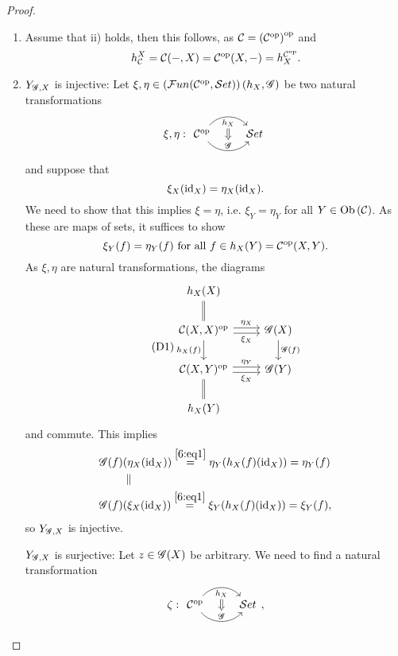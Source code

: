 \begin{proof}
  \begin{enumerate}
    \item Assume that ii) holds, then this follows, as $\mathcal{C} = \left(\mathcal{C}^{\mathrm{op}}\right)^{\mathrm{op}}$ and
    \[
    h^X_{\mathcal{C}} = \mathcal{C}(-,X) = \mathcal{C}^{\mathrm{op}}(X,-)=h_X^{\mathcal{C}^{\mathrm{op}}}.
    \]
    \item $Y_{\mathscr{G},X}$ is injective: Let $\xi,\eta\in \left(\mathcal{F}un(\mathcal{C}^{\mathrm{op}},\mathcal{S}et)\right)(h_X,\mathscr{G})$ be two natural transformations
    \[
    \xi,\eta: \begin{tikzcd}
    \op{\ccat} \arrow[r, bend left=50, "h_X"{name=U, below}]
    \arrow[r, bend right=50, "\gfunc"{name=D}]
    &\stc
    \arrow[Rightarrow, from=U, to=D]
  \end{tikzcd}\]
  and suppose that
  \[
  \xi_X(\operatorname{id}_X)=\eta_X(\operatorname{id}_X).
  \]
  We need to show that this implies $\xi=\eta$, i.e. $\xi_Y=\eta_Y$ for all $Y\in \text{Ob}\left(\mathcal{\mathcal{C}}\right)$. As these are maps of sets, it suffices to show
  \[
  \xi_Y(f)=\eta_Y(f)~\text{for all }f\in h_X(Y)=\mathcal{C}^{\mathrm{op}}(X,Y).
  \]
  As $\xi,\eta$ are natural transformations, the diagrams
  \begin{equation}\tag{D1}\label{6:eq1}
  \begin{tikzcd}
    h_X(X)\ar[equal]{d}&\\
    \op{\ccat(X,X)}\ar[shift left]{r}{\eta_X}\ar[shift right,swap]{r}{\xi_X}\ar[swap]{d}{h_X(f)}&\gfunc(X)\ar{d}{\gfunc(f)}\\
    \op{\ccat(X,Y)}\ar[shift left]{r}{\eta_Y}\ar[shift right, swap]{r}{\xi_X}&\gfunc(Y)\\
    h_X(Y)\ar[equal]{u}&
  \end{tikzcd}
\end{equation}
  and
commute. This implies
\begin{align*}
  \mathscr{G}(f)&(\eta_X(\operatorname{id}_X)) \overset{\eqref{6:eq1}}{=}\eta_Y(h_X(f)(\operatorname{id}_X)) = \eta_Y(f)\\
  &\parallel\\
  \mathscr{G}(f)&(\xi_X(\operatorname{id}_X)) \overset{\eqref{6:eq1}}{=}\xi_Y(h_X(f)(\operatorname{id}_X)) = \xi_Y(f),
\end{align*}
so $Y_{\mathscr{G},X}$ is injective.\par
$Y_{\mathscr{G},X}$ is surjective: Let $z\in \mathscr{G}(X)$ be arbitrary. We need to find a natural transformation
\[
\zeta: \begin{tikzcd}
\op{\ccat} \arrow[r, bend left=50, "h_X"{name=U, below}]
\arrow[r, bend right=50, "\gfunc"{name=D}]
&\stc
\arrow[Rightarrow, from=U, to=D]
\end{tikzcd},\]

\end{enumerate}
\end{proof}
